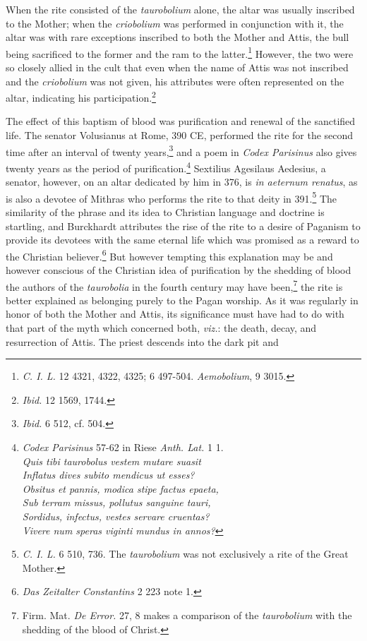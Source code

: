 \documentclass[a4paper, 11pt, oneside, polutonikogreek, english]{article}
\begin{document}
When the rite consisted of the \emph{taurobolium} alone, the altar was usually inscribed to the Mother; when the \emph{criobolium} was performed in conjunction with it, the altar was with rare exceptions inscribed to both the Mother and Attis, the bull being sacrificed to the former and the ram to the latter.\footnote{\emph{C. I. L.} 12 4321, 4322, 4325; 6 497-504. \emph{Aemobolium}, 9 3015.} However, the two were so closely allied in the cult that even when the name of Attis was not inscribed and the \emph{criobolium} was not given, his attributes were often represented on the altar, indicating his participation.\footnote{\emph{Ibid.} 12 1569, 1744.}

The effect of this baptism of blood was purification and renewal of the sanctified life. The senator Volusianus at Rome, 390 \textsc{CE}, performed the rite for the second time after an interval of twenty years,\footnote{\emph{Ibid.} 6 512, cf. 504.} and a poem in \emph{Codex Parisinus} also gives twenty years as the period of purification.\footnote{\emph{Codex Parisinus} 57-62 in Riese \emph{Anth. Lat.} 1 1.\\\hspace*{10mm}\emph{Quis tibi taurobolus vestem mutare suasit}\\\hspace*{10mm}\emph{Inflatus dives subito mendicus ut esses?}\\\hspace*{10mm}\emph{Obsitus et pannis, modica stipe factus epaeta,}\\\hspace*{10mm}\emph{Sub terram missus, pollutus sanguine tauri,}\\\hspace*{10mm}\emph{Sordidus, infectus, vestes servare cruentas?}\\\hspace*{10mm}\emph{Vivere num speras viginti mundus in annos?}} Sextilius Agesilaus Aedesius, a senator, however, on an altar dedicated by him in 376, is \emph{in aeternum renatus}, as is also a devotee of Mithras who performs the rite to that deity in 391.\footnote{\emph{C. I. L.} 6 510, 736. The \emph{taurobolium} was not exclusively a rite of the Great Mother.} The similarity of the phrase and its idea to Christian language and doctrine is startling, and Burckhardt attributes the rise of the rite to a desire of Paganism to provide its devotees with the same eternal life which was promised as a reward to the Christian believer.\footnote{\emph{Das Zeitalter Constantins} 2 223 note 1.} But however tempting this explanation may be and however conscious of the Christian idea of purification by the shedding of blood the authors of the \emph{taurobolia} in the fourth century may have been,\footnote{Firm. Mat. \emph{De Error.} 27, 8 makes a comparison of the \emph{taurobolium} with the shedding of the blood of Christ.} the rite is better explained as belonging purely to the Pagan worship. As it was regularly in honor of both the Mother and Attis, its significance must have had to do with that part of the myth which concerned both, \emph{viz.}: the death, decay, and resurrection of Attis. The priest descends into the dark pit and 
\end{document}
